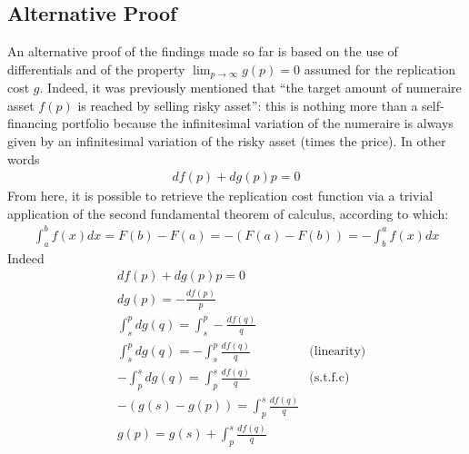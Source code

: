 \documentclass[12pt]{article}
\begin{document}
\subsection{Alternative Proof}
An alternative proof of the findings made so far is based on the use of differentials and of the property $\lim_{p\rightarrow \infty}g(p) = 0$ assumed for the replication cost $g$. Indeed, it was previously mentioned that ``the target amount of numeraire asset $f(p)$ is reached by selling risky asset'': this is nothing more than a self-financing portfolio because the infinitesimal variation of the numeraire is always given by an infinitesimal variation of the risky asset (times the price). In other words 
\begin{align*}
    df(p)+dg(p)p=0
\end{align*}
From here, it is possible to retrieve the replication cost function via a trivial application of the second fundamental theorem of calculus, according to which: 
\begin{align*}
    \int_a^b f(x)dx = F(b)-F(a) = -(F(a)-F(b)) = -\int_b^a f(x) dx
\end{align*}
Indeed
\begin{align*}
    &df(p)+dg(p)p=0\\
    &dg(p) = - \frac{df(p)}{p}\\
    &\int_s^p dg(q) = \int_s^p - \frac{df(q)}{q}\\
    &\int_s^p dg(q) = - \int_s^p  \frac{df(q)}{q}& \text{(linearity)}\\ 
    &-\int_p^s dg(q) = \int_p^s  \frac{df(q)}{q}& \text{(s.t.f.c)}\\ 
    &-(g(s)-g(p)) = \int_p^s  \frac{df(q)}{q}\\
    &g(p) = g(s) +\int_p^s  \frac{df(q)}{q}\\
\end{align*}
 
\end{document}
